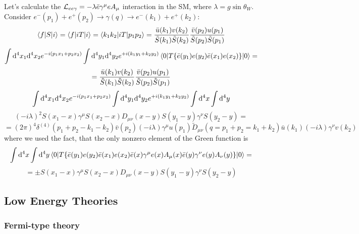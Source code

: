 Let's calculate the ${\mathcal L}_{ee\gamma}=-\lambda \bar e\gamma^\mu e A_\mu$ interaction in the SM, where $\lambda=g\sin\theta_W$. Consider $e^-(p_1)+e^+(p_2)\to\gamma(q)\to e^-(k_1)+e^+(k_2)$: 
\begin{equation*}
  \mathinner{\langle{f|S|i}\rangle}= \mathinner{\langle{f|iT|i}\rangle}= \mathinner{\langle{k_1 k_2|iT|p_1p_2}\rangle}= {\bar u(k_1) v(k_2)\over\tilde S(k_1)\tilde S(k_2)} {\bar v(p_2) u(p_1)\over\tilde S(p_2)\tilde S(p_1)}
\end{equation*}
\begin{equation*}
  \int{\rm d}^4 x_1{\rm d}^4 x_2 e^{-i (p_1x_1 + p_2x_2)} \int{\rm d}^4 y_1{\rm d}^4 y_2 e^{+i (k_1y_1 + k_2y_2)} \mathinner{\langle{0|T\{\bar e(y_1) e(y_2) \bar e(x_1) e(x_2)\}|0}\rangle} =
\end{equation*}
\begin{equation*}
  = {\bar u(k_1) v(k_2)\over\tilde S(k_1)\tilde S(k_2)} {\bar v(p_2) u(p_1)\over\tilde S(p_2)\tilde S(p_1)}
\end{equation*}
\begin{equation*}
  \int{\rm d}^4 x_1{\rm d}^4 x_2 e^{-i (p_1x_1 + p_2x_2)} \int{\rm d}^4 y_1{\rm d}^4 y_2 e^{+i (k_1y_1 + k_2y_2)} \int{\rm d}^4 x \int{\rm d}^4 y
\end{equation*}
\begin{equation*}
  (-i\lambda)^2 S(x_1-x)\gamma^\mu S(x_2-x) D_{\mu\nu}(x-y)S(y_1-y)\gamma^\nu S(y_2-y) =
\end{equation*}
\begin{equation*}
  =(2\pi)^4\delta^{(4)}(p_1+p_2-k_1-k_2)\bar v(p_2)(-i\lambda)\gamma^\mu u(p_1)\tilde D_{\mu\nu}(q=p_1+p_2=k_1+k_2) \bar u(k_1)(-i\lambda)\gamma^\nu v(k_2)
\end{equation*}
where we used the fact, that the only nonzero element of the Green function is 
\begin{equation*}
  \int{\rm d}^4 x \int{\rm d}^4 y \mathinner{\langle{0|T\{\bar e(y_1) e(y_2) \bar e(x_1) e(x_2) \bar e(x)\gamma^\mu e(x) A_\mu(x) \bar e(y)\gamma^\nu e(y) A_\nu(y) \}|0}\rangle} =
\end{equation*}
\begin{equation*}
  =\pm S(x_1-x) \gamma^\mu S(x_2-x)D_{\mu\nu}(x-y)S(y_1-y)\gamma^\nu S(y_2-y)
\end{equation*}

\subsection{Low Energy Theories}

\subsubsection{Fermi-type theory}


